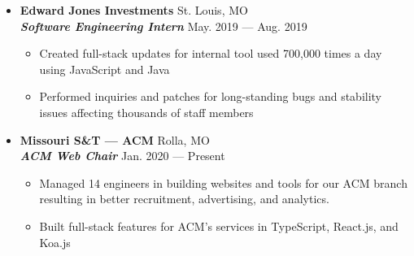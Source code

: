 \documentclass[9pt,oneside]{memoir}
\begin{document}
\begin{itemize}
      \item[] \textbf{Edward Jones Investments}
            \hfill St. Louis, MO\\
            \textit{\textbf{Software Engineering Intern}}
            \hfill May. 2019 --- Aug. 2019
            \begin{itemize}
                  \item[\textbullet] Created full-stack updates for internal tool used 700,000 times a day using JavaScript and Java
                  \item[\textbullet] Performed inquiries and patches for long-standing bugs and stability issues affecting thousands of staff members
            \end{itemize}

      \item[] \textbf{Missouri S\&T --- ACM}
            \hfill Rolla, MO\\
            \textit{\textbf{ACM Web Chair}}
            \hfill Jan. 2020 --- Present
            \begin{itemize}
                  \item[\textbullet] Managed 14 engineers in building websites and tools for our ACM branch resulting in better
                        recruitment, advertising, and analytics.
                  \item[\textbullet] Built full-stack features for ACM's services in TypeScript, React.js, and Koa.js
            \end{itemize}
\end{itemize}

\vspace*{-11px}
\end{document}
